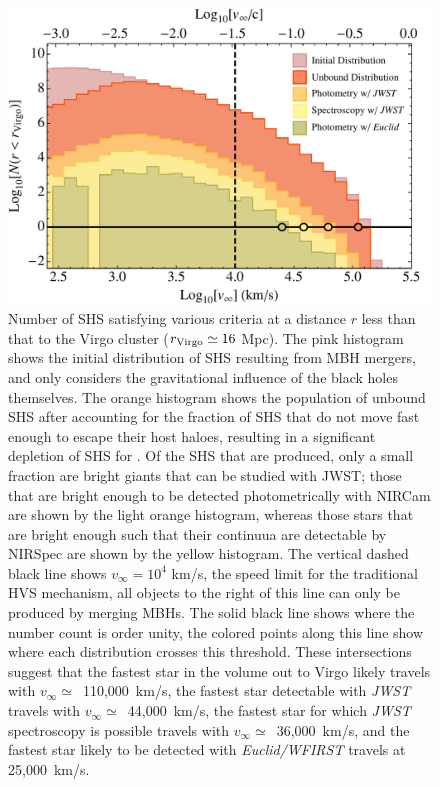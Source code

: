 \documentclass[a4paper,twocolumn]{emulateapj}
\begin{document}
\begin{figure}
\centering\includegraphics[width=0.7\linewidth,clip=true]{histogram-2}
\caption{Number of SHS satisfying various criteria at a distance $r$ less than that to the Virgo cluster ($r_{\rm Virgo} \simeq 16$ Mpc). The pink histogram shows the initial distribution of SHS resulting from MBH mergers, and only considers the gravitational influence of the black holes themselves. The orange histogram shows the population of unbound SHS after accounting for the fraction of SHS that do not move fast enough to escape their host haloes, resulting in a significant depletion of SHS for . Of the SHS that are produced, only a small fraction are bright giants that can be studied with JWST; those that are bright enough to be detected photometrically with NIRCam are shown by the light orange histogram, whereas those stars that are bright enough such that their continuua are detectable by NIRSpec are shown by the yellow histogram. The vertical dashed black line shows $v_{\infty} = 10^{4}$ km/s, the speed limit for the traditional HVS mechanism, all objects to the right of this line can only be produced by merging MBHs. The solid black line shows where the number count is order unity, the colored points along this line show where each distribution crosses this threshold. These intersections suggest that the fastest star in the volume out to Virgo likely travels with $v_{\infty} \simeq$~110,000~km/s, the fastest star detectable with {\it JWST} travels with $v_{\infty} \simeq$~44,000~km/s, the fastest star for which {\it JWST} spectroscopy is possible travels with $v_{\infty} \simeq$~36,000~km/s, and the fastest star likely to be detected with {\it Euclid/WFIRST} travels at 25,000~km/s.}
\label{fig:histogram2}
\end{figure}
\end{document}
